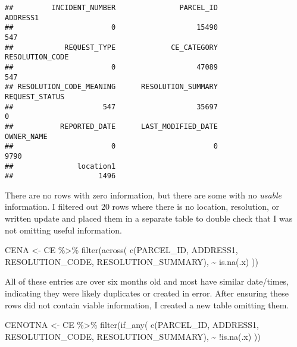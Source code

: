 \documentclass[
]{book}
\newenvironment{Shaded}{\begin{snugshade}}{\end{snugshade}}
\newcommand{\FunctionTok}[1]{\textcolor[rgb]{0.00,0.00,0.00}{#1}}
\newcommand{\NormalTok}[1]{#1}
\newcommand{\OtherTok}[1]{\textcolor[rgb]{0.56,0.35,0.01}{#1}}
\newcommand{\SpecialCharTok}[1]{\textcolor[rgb]{0.00,0.00,0.00}{#1}}
\begin{document}
\begin{verbatim}
##         INCIDENT_NUMBER               PARCEL_ID                ADDRESS1 
##                       0                   15490                     547 
##            REQUEST_TYPE             CE_CATEGORY         RESOLUTION_CODE 
##                       0                   47089                     547 
## RESOLUTION_CODE_MEANING      RESOLUTION_SUMMARY          REQUEST_STATUS 
##                     547                   35697                       0 
##           REPORTED_DATE      LAST_MODIFIED_DATE              OWNER_NAME 
##                       0                       0                    9790 
##               location1 
##                    1496
\end{verbatim}

There are no rows with zero information, but there are some with no \emph{usable} information. I filtered out 20 rows where there is no location, resolution, or written update and placed them in a separate table to double check that I was not omitting useful information.

\begin{Shaded}
\begin{Highlighting}[]
\NormalTok{CENA }\OtherTok{\textless{}{-}}
\NormalTok{  CE }\SpecialCharTok{\%\textgreater{}\%} \FunctionTok{filter}\NormalTok{(}\FunctionTok{across}\NormalTok{(}
    \FunctionTok{c}\NormalTok{(PARCEL\_ID,}
\NormalTok{      ADDRESS1,}
\NormalTok{      RESOLUTION\_CODE,}
\NormalTok{      RESOLUTION\_SUMMARY),}
    \SpecialCharTok{\textasciitilde{}} \FunctionTok{is.na}\NormalTok{(.x)}
\NormalTok{  ))}
\end{Highlighting}
\end{Shaded}

All of these entries are over six months old and most have similar date/times, indicating they were likely duplicates or created in error. After ensuring these rows did not contain viable information, I created a new table omitting them.

\begin{Shaded}
\begin{Highlighting}[]
\NormalTok{CENOTNA }\OtherTok{\textless{}{-}}\NormalTok{ CE }\SpecialCharTok{\%\textgreater{}\%} \FunctionTok{filter}\NormalTok{(}\FunctionTok{if\_any}\NormalTok{(}
  \FunctionTok{c}\NormalTok{(PARCEL\_ID,}
\NormalTok{    ADDRESS1,}
\NormalTok{    RESOLUTION\_CODE,}
\NormalTok{    RESOLUTION\_SUMMARY),}
  \SpecialCharTok{\textasciitilde{}} \SpecialCharTok{!}\FunctionTok{is.na}\NormalTok{(.x)}
\NormalTok{))}
\end{Highlighting}
\end{Shaded}
\end{document}
